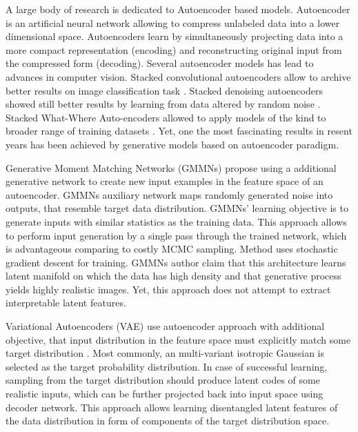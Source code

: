 A large body of research is dedicated to Autoencoder based models.
Autoencoder is an artificial neural network allowing to compress unlabeled data into a lower dimensional space.
Autoencoders learn by simultaneously projecting data into a more compact representation (encoding) and reconstructing original input from the compressed form (decoding).
Several autoencoder models has lead to advances in computer vision.
Stacked convolutional autoencoders allow to archive better results on image classification task \cite{Masci2011}.
Stacked denoising autoencoders showed still better results by learning from data altered by random noise  \cite{Vincent2010}.
Stacked What-Where Auto-encoders allowed to apply models of the kind to broader range of training datasets \cite{Zhao2015}.
Yet, one the most fascinating results in resent years has been achieved by generative models based on autoencoder paradigm.

Generative Moment Matching Networks (GMMNs) \cite{Li2015, Ren2016} propose using a additional generative network to create new input examples in the feature space of an autoencoder.
GMMNs auxiliary network maps randomly generated noise into outputs, that resemble target data distribution.
GMMNs' learning objective is to generate inputs with similar statistics as the training data.
This approach allows to perform input generation by a single pass through the trained network, which is advantageous comparing to costly MCMC sampling.
Method uses stochastic gradient descent for training.
GMMNs author claim that this architecture learns latent manifold on which the data has high density and that generative process yields highly realistic images.
Yet, this approach does not attempt to extract interpretable latent features.

Variational Autoencoders (VAE) use autoencoder approach with additional objective, that input distribution in the feature space must explicitly match some target distribution \cite{Kingma2013, Doersch2016}.
Most commonly, an multi-variant isotropic Gaussian is selected as the target probability distribution.
In case of successful learning, sampling from the target distribution should produce latent codes of some realistic inputs, which can be further projected back into input space using decoder network.
This approach allows learning disentangled latent features of the data distribution in form of components of the target distribution space.

